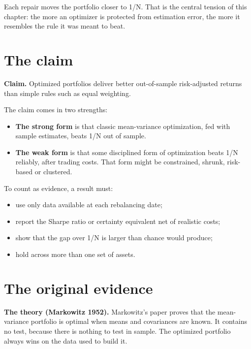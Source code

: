Each repair moves the portfolio closer to 1/N. That is the central tension of this chapter: the more an optimizer is protected from estimation error, the more it resembles the rule it was meant to beat.

\section{The claim}
\label{sec:19-claim}

\begin{callout}
\textbf{Claim.} Optimized portfolios deliver better out-of-sample risk-adjusted returns than simple rules such as equal weighting.
\end{callout}

The claim comes in two strengths:

\begin{itemize}
  \item \textbf{The strong form} is that classic mean-variance optimization, fed with sample estimates, beats 1/N out of sample.
  \item \textbf{The weak form} is that some disciplined form of optimization beats 1/N reliably, after trading costs. That form might be constrained, shrunk, risk-based or clustered.
\end{itemize}

To count as evidence, a result must:

\begin{itemize}
  \item use only data available at each rebalancing date;
  \item report the Sharpe ratio or certainty equivalent net of realistic costs;
  \item show that the gap over 1/N is larger than chance would produce;
  \item hold across more than one set of assets.
\end{itemize}

\section{The original evidence}
\label{sec:19-evidence}

\textbf{The theory (Markowitz 1952).} Markowitz's paper proves that the mean-variance portfolio is optimal when means and covariances are known. It contains no test, because there is nothing to test in sample. The optimized portfolio always wins on the data used to build it.

